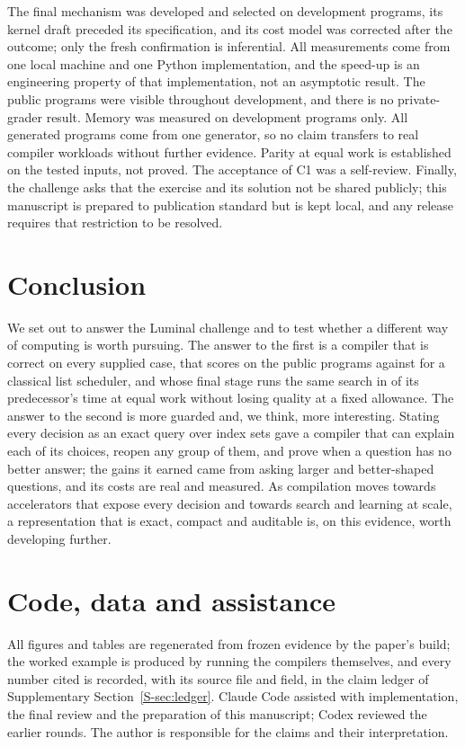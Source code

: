 \documentclass[11pt,a4paper]{article}
\begin{document}
The final mechanism was developed and selected on development programs, its
kernel draft preceded its specification, and its cost model was corrected after the
outcome; only the fresh confirmation is inferential. All measurements come from
one local machine and one Python implementation, and the speed-up is an
engineering property of that implementation, not an asymptotic result. The
public programs were visible throughout development, and there is no
private-grader result. Memory was measured on development programs only. All
generated programs come from one generator, so no claim transfers to real
compiler workloads without further evidence. Parity at equal work is established on
the tested inputs, not proved. The acceptance of C1 was a self-review. Finally, the
challenge asks that the exercise and its solution not be shared publicly; this
manuscript is prepared to publication standard but is kept local, and any release
requires that restriction to be resolved.

\section{Conclusion}\label{sec:conclusion}

We set out to answer the Luminal challenge and to test whether a different way of
computing is worth pursuing. The answer to the first is a compiler that is correct
on every supplied case, that scores  on the public programs against
 for a classical list scheduler, and whose final stage runs the
same search in  of its predecessor's time at equal work without losing
quality at a fixed allowance. The answer to the second is more guarded and, we
think, more interesting. Stating every decision as an exact query over index sets
gave a compiler that can explain each of its choices, reopen any group of them, and
prove when a question has no better answer; the gains it earned came from asking
larger and better-shaped questions, and its costs are real and measured. As
compilation moves towards accelerators that expose every decision and towards
search and learning at scale, a representation that is exact, compact and
auditable is, on this evidence, worth developing further.

\section*{Code, data and assistance}
All figures and tables are regenerated from frozen evidence by the paper's build;
the worked example is produced by running the compilers themselves, and every
number cited is recorded, with its source file and field, in the claim ledger of
Supplementary Section~\ref{S-sec:ledger}. Claude Code assisted with implementation,
the final review and the preparation of this manuscript; Codex reviewed the earlier
rounds. The author is responsible for the claims and their interpretation.
\end{document}
